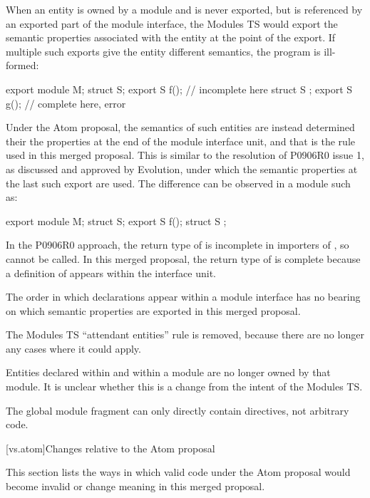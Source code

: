 \pnum
When an entity is owned by a module and is never exported,
but is referenced by an exported part of the module interface,
the Modules TS would export the semantic properties
associated with the entity at the point of the export.
If multiple such exports give the entity different semantics,
the program is ill-formed:

\begin{codeblock}
export module M;
struct S;
export S f();  //  incomplete here
struct S {};
export S g();  //  complete here, error
\end{codeblock}

Under the Atom proposal,
the semantics of such entities
are instead determined their the properties
at the end of the module interface unit,
and that is the rule used in this merged proposal.
This is similar to the resolution of P0906R0 issue 1,
as discussed and approved by Evolution,
under which the semantic properties at the last such export are used.
The difference can be observed in a module such as:

\begin{codeblock}
export module M;
struct S;
export S f();
struct S {};
\end{codeblock}

In the P0906R0 approach,
the return type of  is incomplete
in importers of ,
so  cannot be called.
In this merged proposal,
the return type of  is complete
because a definition of 
appears within the interface unit.
\begin{note}
The order in which declarations appear within a module interface
has no bearing on which semantic properties are exported
in this merged proposal.
\end{note}

The Modules TS ``attendant entities'' rule is removed,
because there are no longer any cases where it could apply.

\pnum
Entities declared within  and 
within a module are no longer owned by that module.
It is unclear whether this is a change from the intent of
the Modules TS.

\pnum
The global module fragment can only
directly contain  directives,
not arbitrary code.

[vs.atom]{Changes relative to the Atom proposal}

\pnum
This section lists the ways in which valid code under the Atom proposal
would become invalid or change meaning in this merged proposal.


